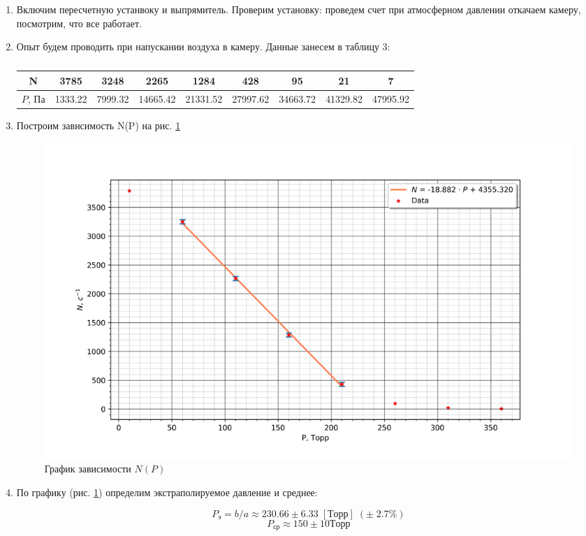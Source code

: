 \documentclass[a4paper]{article}
\begin{document}
\begin{enumerate}
    \item Включим пересчетную устанвоку и выпрямитель. Проверим установку: проведем счет при атмосферном давлении 
    откачаем камеру, посмотрим, что все работает.


    \item Опыт будем проводить при напускании воздуха в камеру. Данные занесем в таблицу 3:
    
    \begin{table}[h]
        \centering
        \caption{}
        \label{t1}
        \begin{tabular}{|c||c|c|c|c|c|c|c|c|}
            \hline
            N& 3785& 3248&2265&1284&428&95&21&7 \\ \hline
            $P$, Па &1333.22& 7999.32& 14665.42& 21331.52& 27997.62& 34663.72& 41329.82& 47995.92 \\ \hline
        \end{tabular}
    \end{table}


    \item Построим зависимость N(P) на рис. \ref{gr3}
    
    \begin{figure}[H]
        \begin{center}
        \includegraphics[scale = 0.8]{gr3.png}
        \caption{График зависимости $ N(P)$}
        \label{gr3}
        \end{center}
    \end{figure}

    \item По графику (рис. \ref{gr3}) определим экстраполируемое давление и среднее:
    
    $$P_э = b/a \approx 230.66 \pm 6.33 \; [Торр] \; (\pm \; 2.7 \%)$$
    $$P_{ср} \approx 150 \pm 10 Торр$$


\end{enumerate}
\end{document}
